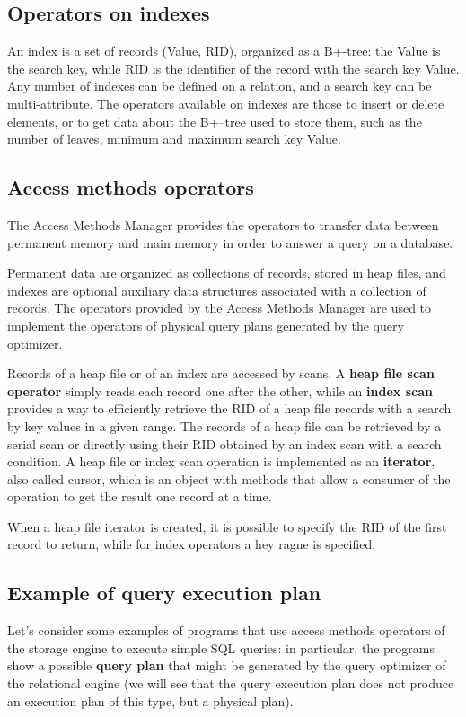 \subsection{Operators on indexes}
An index is a set of records (Value, RID), organized as a B+-tree: the Value is the search key, while RID is the identifier of the record with the search key Value. Any number of indexes can be defined on a relation, and a search key can be multi-attribute. The operators available on indexes are those to insert or delete elements, or to get data about the B+–tree used to store them, such as the number of leaves, minimum and maximum search key Value.

\subsection{Access methods operators}

\begin{tcolorbox}
    The Access Methods Manager provides the operators to transfer data between permanent memory and main memory in order to answer a query on a database. 
\end{tcolorbox}

Permanent data are organized as collections of records, stored in heap files, and indexes are optional auxiliary data structures associated with a collection of records. The operators provided by the Access Methods Manager are used to implement the operators of physical query plans generated by the query optimizer. 

Records of a heap file or of an index are accessed by scans. A \textbf{heap file scan operator} simply reads each record one after the other, while an \textbf{index scan} provides a way to efficiently retrieve the RID of a heap file records with a search by key values in a given range. The records of a heap file can be retrieved by a serial scan or directly using their RID obtained by an index scan with a search condition. A heap file or index scan operation is implemented as an \textbf{iterator}, also called cursor, which is an object with methods that allow a consumer of the operation to get the result one record at a time.

When a heap file iterator is created, it is possible to specify the RID of the first record to return, while for index operators a hey ragne is specified.

\subsection{Example of query execution plan}
Let's consider some examples of programs that use access methods operators of the storage engine to execute simple SQL queries: in particular, the programs show a possible \textbf{query plan} that might be generated by the query optimizer of the relational engine (we will see that the query execution plan does not produce an execution plan of this type, but a physical plan). 

